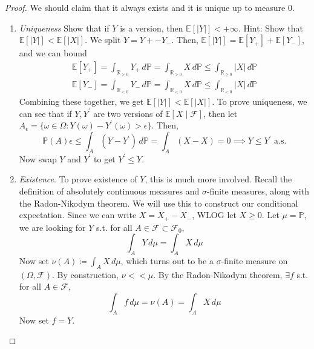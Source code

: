 	\begin{proof}
		We should claim that it always exists and it is unique up to measure $0$. 
		\begin{enumerate}
			\item \textit{Uniqueness} Show that if $Y$ is a version, then $\mathbb{E}[|Y|] < +\infty$. Hint: Show that $\mathbb{E}[|Y|] < \mathbb{E}[|X|]$. We split $Y = Y+ - Y_{-}$. Then, $\mathbb{E}[|Y|] = \mathbb{E}[Y_+] + \mathbb{E}[Y_-]$, and we can bound 
				\begin{align}
					\mathbb{E}[Y_+] = \int_{\mathbb{R}_{>0}} Y_+ \,d\mathbb{P} = \int_{\mathbb{R}_{>0}} X \,d\mathbb{P} \leq \int_{\mathbb{R}_{\geq 0}} |X| \,d\mathbb{P} \\ 
					\mathbb{E}[Y_-] = \int_{\mathbb{R}_{<0}} Y_- \,d\mathbb{P} = \int_{\mathbb{R}_{<0}} X \,d\mathbb{P} \leq \int_{\mathbb{R}_{< 0}} |X| \,d\mathbb{P} 
				\end{align}
				Combining these together, we get $\mathbb{E}[|Y|] < \mathbb{E}[|X|]$. To prove uniqueness, we can see that if $Y, Y^\prime$ are two versions of $\mathbb{E}[X \mid \mathscr{F}]$, then let $A_\epsilon = \{\omega \in \Omega \colon Y(\omega) - Y^\prime (\omega) > \epsilon \}$. Then, 
				\begin{equation}
					\mathbb{P}(A) \epsilon \leq \int_A (Y - Y^\prime) \,d\mathbb{P} = \int_A (X - X) = 0 \implies Y \leq Y^\prime \text{ a.s.}
				\end{equation}
				Now swap $Y$ and $Y^\prime$ to get $Y^\prime \leq Y$. 
			\item \textit{Existence}. To prove existence of $Y$, this is much more involved. Recall the definition of absolutely continuous measures and $\sigma$-finite measures, along with the Radon-Nikodym theorem. We will use this to construct our conditional expectation. Since we can write $X = X_+ - X_-$, WLOG let $X \geq 0$. Let $\mu = \mathbb{P}$, we are looking for $Y$ s.t. for all $A \in \mathscr{F} \subset \mathscr{F}_0$, 
				\begin{equation}
				  \int_A Y \,d\mu = \int_A X \,d\mu
				\end{equation}
				Now set $\nu(A) \coloneqq \int_A X \,d\mu$, which turns out to be a $\sigma$-finite measure on $(\Omega, \mathscr{F})$. By construction, $\nu << \mu$. By the Radon-Nikodym theorem, $\exists f$ s.t. for all $A \in \mathscr{F}$, 
				\begin{equation}
				  \int_A f \,d\mu = \nu(A) = \int_A X \,d\mu
				\end{equation}
				Now set $f = Y$. 
		\end{enumerate}
	\end{proof}

